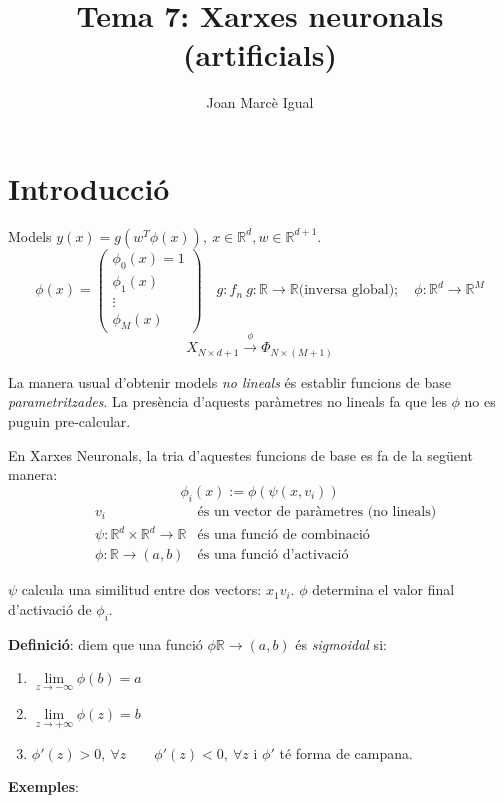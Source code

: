 \documentclass[a4paper]{article}
\title{Tema 7: Xarxes neuronals (artificials)}
\author{Joan Marcè Igual}
\begin{document}
\maketitle

\section{Introducció}
Models $y(x) = g(w^T \phi (x)),\ x \in \mathbb{R}^d, w \in \mathbb{R}^{d + 1}$.
$$
\phi(x) = 
\begin{pmatrix}
\phi_0(x) = 1 \\
\phi_1(x)\\
\vdots\\
\phi_M(x)
\end{pmatrix}
\quad 
g : f_n \ g:\mathbb{R} \rightarrow \mathbb{R} \text{(inversa global)}; 
\quad \phi : \mathbb{R}^d \rightarrow \mathbb{R}^M
$$
$$
X_{N \times d+ 1} \xrightarrow{\phi} \Phi_{N \times (M + 1)}
$$

La manera usual d'obtenir models \emph{no lineals} és establir funcions de base \emph{parametritzades}. La presència d'aquests paràmetres no lineals fa que les $\phi$ no es puguin pre-calcular.

En Xarxes Neuronals, la tria d'aquestes funcions de base es fa de la següent manera:
$$
\phi_i(x) := \phi (\psi(x, v_i))
$$
\begin{align*}
	&v_i & \text{és un vector de paràmetres (no lineals)} \\
	&\psi : \mathbb{R}^d \times \mathbb{R}^d \rightarrow \mathbb{R}
	& \text{és una funció de combinació} \\
	&\phi : \mathbb{R} \rightarrow (a,b) &
	\text{és una funció d'activació}
\end{align*}

$\psi$ calcula una similitud entre dos vectors: $x_1 v_i$.
$\phi$ determina el valor final d'activació de $\phi_i$.

\textbf{Definició}: diem que una funció $\phi \mathbb{R} \rightarrow (a,b)$ és \emph{sigmoidal} si:
\begin{enumerate}
	\item $\lim\limits_{z \rightarrow - \infty} \phi(b) = a$
	\item $\lim\limits_{z \rightarrow + \infty} \phi(z) = b$
	\item $\phi'(z) > 0,\ \forall z \qquad \phi'(z) < 0,\ \forall z$ i $\phi'$ té forma de campana.
\end{enumerate}

\textbf{Exemples}:
\end{document}
